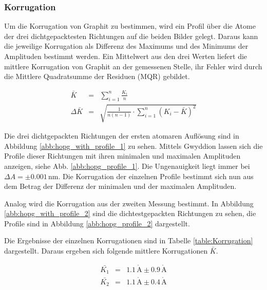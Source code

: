 \documentclass[12pt,a4paper]{scrartcl}
\numberwithin{equation}{section} %
\begin{document}
\hypertarget{korrugation}{%
\subsubsection{Korrugation}\label{korrugation}}

Um die Korrugation von Graphit zu bestimmen, wird ein Profil über die Atome der drei dichtgepacktesten Richtungen auf die beiden Bilder gelegt. Daraus kann die jeweilige Korrugation als Differenz des Maximums und des Minimums der Amplituden bestimmt werden. Ein Mittelwert aus den drei Werten liefert die mittlere Korrugation von Graphit an der gemessenen Stelle, ihr Fehler wird durch die Mittlere Quadratsumme der Residuen (MQR) gebildet.

\begin{eqnarray}
	\bar{K} &=& \sum_{i=1}^n \frac{K_i}{n} \\
	\Delta \bar{K} &=& \sqrt{\frac{1}{n (n-1)} \cdot \sum_{i=1}^{n} (K_i -\bar{K})^2}
\end{eqnarray}

\noindent
Die drei dichtgepackten Richtungen der ersten atomaren Auflösung sind in Abbildung \ref{abb:hopg_with_profile_1} zu sehen. Mittels Gwyddion \cite{Gwyddion} lassen sich die Profile dieser Richtungen mit ihren minimalen und maximalen Amplituden anzeigen, siehe Abb. \ref{abb:hopg_profile_1}. Die Ungenauigkeit liegt immer bei $\Delta A = \pm 0.001 \mathrm{\,nm}$. Die Korrugation der einzelnen Profile bestimmt sich nun aus dem Betrag der Differenz der minimalen und der maximalen Amplituden.

Analog wird die Korrugation aus der zweiten Messung bestimmt. In Abbildung \ref{abb:hopg_with_profile_2} sind die dichtestgepackten Richtungen zu sehen, die Profile sind in Abbildung \ref{abb:hopg_profile_2} dargestellt.

Die Ergebnisse der einzelnen Korrugationen sind in Tabelle \ref{table:Korrugation} dargestellt. Daraus ergeben sich folgende mittlere Korrugationen $\bar{K}$.

\begin{eqnarray}
	\bar{K_1} &=& 1.1 \mathrm{\,\mathring{A}} \pm 0.9 \mathrm{\,\mathring{A}} \\
	\bar{K_2} &=& 1.1 \mathrm{\,\mathring{A}} \pm 0.4 \mathrm{\,\mathring{A}}
\end{eqnarray}
\end{document}
